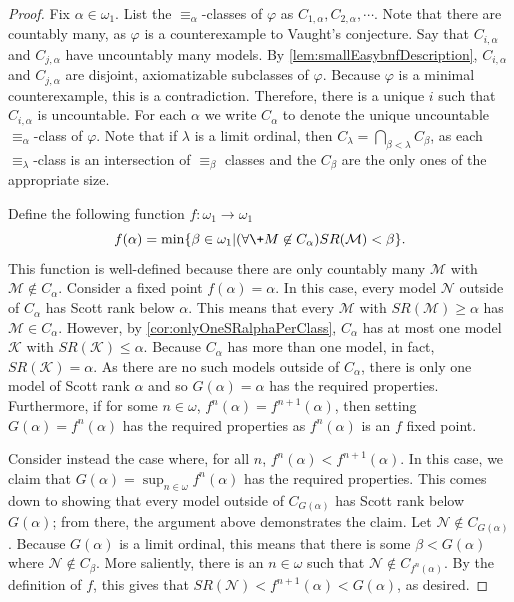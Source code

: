 \documentclass[10pt,a4paper]{amsart}
\renewcommand{\-}{\text{-}}
\begin{document}
\begin{proof}
Fix $\alpha\in\omega_1$.
List the $\equiv_\alpha$-classes of $\varphi$ as $C_{1,\alpha},C_{2,\alpha},\cdots$.
Note that there are countably many, as $\varphi$ is a counterexample to Vaught's conjecture.
Say that $C_{i,\alpha}$ and $C_{j,\alpha}$ have uncountably many models.
By \cref{lem:smallEasybnfDescription}, $C_{i,\alpha}$ and $C_{j,\alpha}$ are disjoint, axiomatizable subclasses of $\varphi$.
Because $\varphi$ is a minimal counterexample, this is a contradiction.
Therefore, there is a unique $i$ such that $C_{i,\alpha}$ is uncountable.
For each $\alpha$ we write $C_\alpha$ to denote the unique uncountable $\equiv_\alpha$-class of $\varphi$.
Note that if $\lambda$ is a limit ordinal, then $C_\lambda = \bigcap_{\beta<\lambda} C_\beta$, as each $\equiv_\lambda$-class is an intersection of $\equiv_\beta$ classes and the $C_\beta$ are the only ones of the appropriate size.

Define the following function $f:\omega_1\to\omega_1$
\[f(\alpha)=\min\{ \beta\in\omega_1 | (\forall \+M\not\in C_\alpha) SR(\mathcal{M})<\beta\}. \]
This function is well-defined because there are only countably many $\mathcal{M}$ with $\mathcal{M}\not\in C_\alpha$.
Consider a fixed point $f(\alpha)=\alpha$.
In this case, every model $\mathcal{N}$ outside of $C_\alpha$ has Scott rank below $\alpha$.
This means that every $\mathcal{M}$ with $SR(\mathcal{M})\geq\alpha$ has $\mathcal{M}\in C_\alpha$.
However, by \cref{cor:onlyOneSRalphaPerClass}, $C_\alpha$ has at most one model $\mathcal{K}$ with $SR(\mathcal{K})\leq\alpha$.
Because $C_\alpha$ has more than one model, in fact, $SR(\mathcal{K})=\alpha$.
As there are no such models outside of $C_\alpha$, there is only one model of Scott rank $\alpha$ and so $G(\alpha)=\alpha$ has the required properties.
Furthermore, if for some $n\in\omega$, $f^n(\alpha)=f^{n+1}(\alpha)$, then setting $G(\alpha)=f^n(\alpha)$ has the required properties as $f^n(\alpha)$ is an $f$ fixed point.

Consider instead the case where, for all $n$, $f^n(\alpha)<f^{n+1}(\alpha)$.
In this case, we claim that $G(\alpha)=\sup_{n\in\omega} f^n(\alpha)$ has the required properties.
This comes down to showing that every model outside of $C_{G(\alpha)}$ has Scott rank below $G(\alpha)$; from there, the argument above demonstrates the claim.
Let $\mathcal{N}\not\in C_{G(\alpha)}$.
Because $G(\alpha)$ is a limit ordinal, this means that there is some $\beta<G(\alpha)$ where $\mathcal{N}\not\in C_\beta$.
More saliently, there is an $n\in\omega$ such that $\mathcal{N}\not\in C_{f^n(\alpha)}$.
By the definition of $f$, this gives that $SR(\mathcal{N})<f^{n+1}(\alpha)<G(\alpha)$, as desired.
\end{proof}
\end{document}
